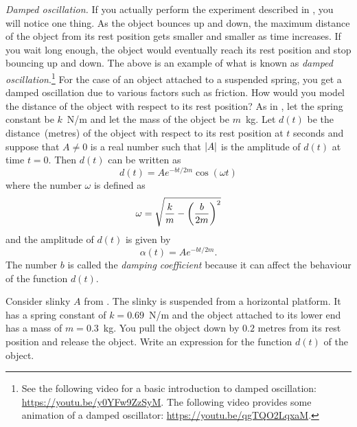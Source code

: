 \documentclass[a4paper,oneside,12pt]{article}
\begin{document}
\begin{problem}
\item\emph{Damped oscillation.}
  If you actually perform the experiment described in
  , you will notice one
  thing.  As the object bounces up and down, the maximum distance of
  the object from its rest position gets smaller and smaller as time
  increases.  If you wait long enough, the object would eventually
  reach its rest position and stop bouncing up and down.  The above is
  an example of what is known as \emph{damped oscillation}.\footnote{
    See the following video for a basic introduction to damped
    oscillation:
    \url{https://youtu.be/y0YFw9ZzSyM}.
    The following video provides some animation of a damped
    oscillator:
    \url{https://youtu.be/qgTQO2LqxaM}.
  }
  For the case of an object attached to a suspended spring, you get a
  damped oscillation due to various factors such as friction.  How
  would you model the distance of the object with respect to its rest
  position?  As in ,
  let the spring constant be $k$~N/m and let the mass of the object be
  $m$~kg.  Let $d(t)$ be the distance~(metres) of the object with
  respect to its rest position at $t$ seconds and suppose that
  $A \neq 0$ is a real number such that $\lvert A\rvert$ is the
  amplitude of $d(t)$ at time $t = 0$.  Then $d(t)$ can be written as
  \begin{equation}
  \label{eqn:trigonometric:damped_model}
  d(t)
  =
  A e^{-bt / 2m} \cos(\omega t)
  \end{equation}
  where the number $\omega$ is defined as
  \begin{equation}
  \label{eqn:trigonometric:damped_omega}
  \omega
  =
  \sqrt{
    \frac{k}{m}
    -
    \parenthesis*{\frac{b}{2m}}^2
  }
  \end{equation}
  and the amplitude of $d(t)$ is given by
  \begin{equation}
  \label{eqn:trigonometric:damped_amplitude}
  \alpha(t)
  =
  A e^{-bt / 2m}.
  \end{equation}
  The number $b$ is called the \emph{damping coefficient} because it
  can affect the behaviour of the function $d(t)$.
  \begin{packedenum}
  \item\label{subprob:trigonometric:damped_b_constant}
    Consider slinky $A$ from
    .
    The slinky is suspended from a horizontal platform.  It has a
    spring constant of $k = 0.69$~N/m and the object attached to its
    lower end has a mass of $m = 0.3$~kg.  You pull the object down by
    $0.2$ metres from its rest position and release the object.  Write
    an expression for the function $d(t)$ of the object.


\end{packedenum}
\end{problem}
\end{document}
